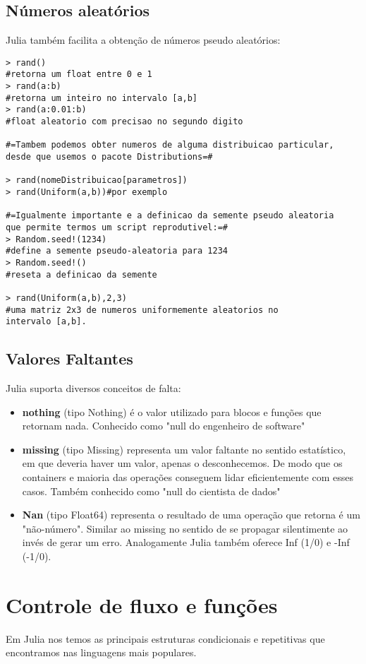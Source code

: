 \subsection{Números aleatórios}
Julia também facilita a obtenção de números pseudo aleatórios:
    \begin{lstlisting}
> rand()  
#retorna um float entre 0 e 1
> rand(a:b) 
#retorna um inteiro no intervalo [a,b]
> rand(a:0.01:b) 
#float aleatorio com precisao no segundo digito

#=Tambem podemos obter numeros de alguma distribuicao particular, 
desde que usemos o pacote Distributions=#

> rand(nomeDistribuicao[parametros])
> rand(Uniform(a,b))#por exemplo

#=Igualmente importante e a definicao da semente pseudo aleatoria
que permite termos um script reprodutivel:=#
> Random.seed!(1234) 
#define a semente pseudo-aleatoria para 1234
> Random.seed!() 
#reseta a definicao da semente

> rand(Uniform(a,b),2,3) 
#uma matriz 2x3 de numeros uniformemente aleatorios no 
intervalo [a,b].

    \end{lstlisting}
\subsection{Valores Faltantes}
Julia suporta diversos conceitos de falta:
\begin{itemize}
    \item \textbf{nothing} (tipo Nothing) é o valor utilizado para blocos e funções que retornam nada. Conhecido como "null do engenheiro de software"
    \item \textbf{missing} (tipo Missing) representa um valor faltante no sentido estatístico, em que deveria haver um valor, apenas o desconhecemos. De modo que os containers e maioria das operações conseguem lidar eficientemente com esses casos. Também conhecido como "null do cientista de dados"
    \item \textbf{Nan} (tipo Float64) representa o resultado de uma operação que retorna é um "não-número". Similar ao missing no sentido de se propagar silentimente ao invés de gerar um erro. Analogamente Julia também oferece Inf (1/0) e -Inf (-1/0).
\end{itemize}
\section{Controle de fluxo e funções}
Em Julia nos temos as principais estruturas condicionais e repetitivas que encontramos nas linguagens mais populares.
